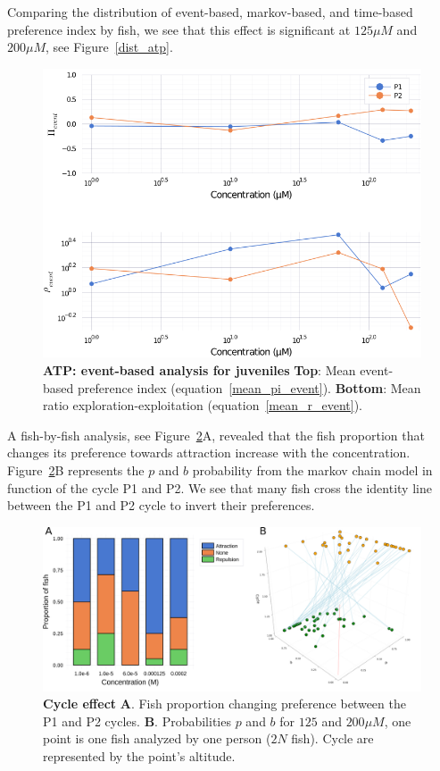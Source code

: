   Comparing the distribution of event-based, markov-based, and time-based preference index by fish, we see that this effect is significant at $125 \mu M$ and  $200 \mu M$, see Figure~\ref{dist_atp}.

    \begin{figure}[h!]
      \centering
      \includegraphics[width=1\textwidth]{part_2/assets/atp_event.png}
      \caption{\textbf{ATP: event-based analysis for juveniles} \textbf{Top}: Mean event-based preference index (equation~\ref{mean_pi_event}). \textbf{Bottom}: Mean ratio exploration-exploitation (equation~\ref{mean_r_event}).}
      \label{atp_event}
    \end{figure}

  A fish-by-fish analysis, see Figure~\ref{proportion}A, revealed that the fish proportion that changes its preference towards attraction increase with the concentration. Figure~\ref{proportion}B represents the $p$ and $b$ probability from the markov chain model in function of the cycle P1 and P2. We see that many fish cross the identity line between the P1 and P2 cycle to invert their preferences.

    \begin{figure}[h!]
      \centering
      \includegraphics[width=1\textwidth]{part_2/assets/proportion.png}
      \caption{\textbf{Cycle effect} \textbf{A}. Fish proportion changing preference between the P1 and P2 cycles. \textbf{B}. Probabilities $p$ and $b$ for $125$ and $200 \mu M$, one point is one fish analyzed by one person ($2N$ fish). Cycle are represented by the point's altitude.}
      \label{proportion}
    \end{figure}

